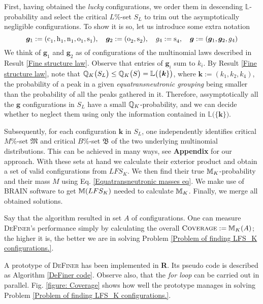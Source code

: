 First, having obtained the {\it lucky} configurations, we order them in descending $\mathbb{L}$-probability and select the critical $L\%$-set $S_L$ to trim out the asymptotically negligible configurations. To show it is so, let us introduce some extra notation
\begin{equation}
	\bm{g}_1 := (\cem{c_1}, \cem{h_1}, \cem{n_1}, \cem{o_1}, \cem{s_1} ), \quad
	\bm{g}_2 := (\cem{o_2}, \cem{s_2}), \quad
	g_4 := \cem{s_4}, \quad 
	\bm{g} := ( \bm{g}_1, \bm{g}_2, g_4)
\end{equation}
We think of $\bm{g}_1$ and $\bm{g}_2$ as of configurations of the multinomial laws described in Result \ref{Fine structure law}. Observe that entries of $\bm{g}_i$ sum to $k_i$. By Result \ref{Fine structure law}, note that $\mathbb{Q}_K \big( S_L \big) \leq \mathbb{Q}_K \big( S \big) = \mathbb{L}\big( \{ \bm{k} \} \big)$, where $\bm{k} := (k_1, k_2, k_4)$, the probability of a peak in a given {\it equatransneutronic grouping} being smaller than the probability of all the peaks gathered in it. Therefore, assymptotically all the $\bm{g}$ configurations in $S_L$ have a small $\mathbb{Q}_K$-probability, and we can decide whether to neglect them using only the information contained in $\mathbb{L}\big( \{ \bm{k} \} \big)$.

Subsequently, for each configuration $\bm{k}$ in $S_L$, one independently identifies critical $M\%$-set $\mathfrak{M}$ and critical $B\%$-set $\mathfrak{B}$ of the two underlying multinomial distributions. This can be achieved in many ways, see \textbf{Appendix} for our approach. With these sets at hand we calculate their exterior product and obtain a set of valid configurations from $LFS_K$. We then find their true $\mathbb{M}_K$-probability and their mass $M$ using Eq. \eqref{Equatransneutronic masses eq}. We make use of \textsc{BRAIN} \cite{Dittwald2013BRAIN} software to get $\mathbb{M}(LFS_K)$ needed to calculate $\mathbb{M}_K$. Finally, we merge all obtained solutions.

Say that the algorithm resulted in set $A$ of configurations. One can measure \textsc{DeFiner}'s performance simply by calculating the overall $\textsc{Coverage} := \mathbb{M}_K(A)$; the higher it is, the better we are in solving Problem \ref{Problem of finding LFS_K configurations.}.

A prototype of \textsc{DeFiner} has been implemented in \textbf{R}. Its pseudo code is described as Algorithm \ref{DeFiner code}. Observe also, that the {\it for loop} can be carried out in parallel. Fig. \ref{figure: Coverage} shows how well the prototype manages in solving Problem \ref{Problem of finding LFS_K configurations.}. 




